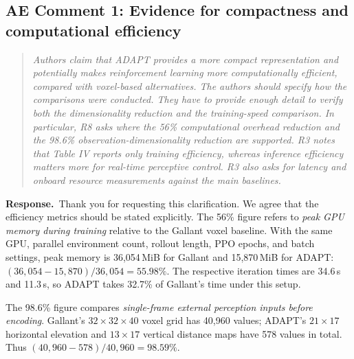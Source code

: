 \documentclass[11pt]{article}
\newenvironment{reviewcomment}{\begin{quote}\color{reviewblue}\itshape}{\end{quote}}
\newcommand{\Response}{\par\noindent\textbf{Response.}\ }
\begin{document}
\subsection*{AE Comment 1: Evidence for compactness and computational efficiency}
\begin{reviewcomment}
Authors claim that ADAPT provides a more compact representation and potentially makes reinforcement learning more computationally efficient, compared with voxel-based alternatives. The authors should specify how the comparisons were conducted. They have to provide enough detail to verify both the dimensionality reduction and the training-speed comparison. In particular, R8 asks where the 56\% computational overhead reduction and the 98.6\% observation-dimensionality reduction are supported. R3 notes that Table IV reports only training efficiency, whereas inference efficiency matters more for real-time perceptive control. R3 also asks for latency and onboard resource measurements against the main baselines.
\end{reviewcomment}
\Response Thank you for requesting this clarification. We agree that the efficiency metrics should be stated explicitly. The 56\% figure refers to \emph{peak GPU memory during training} relative to the Gallant voxel baseline. With the same GPU, parallel environment count, rollout length, PPO epochs, and batch settings, peak memory is 36,054\,MiB for Gallant and 15,870\,MiB for ADAPT: $(36{,}054-15{,}870)/36{,}054=55.98\%$. The respective iteration times are 34.6\,s and 11.3\,s, so ADAPT takes 32.7\% of Gallant's time under this setup.

The 98.6\% figure compares \emph{single-frame external perception inputs before encoding}. Gallant's $32\times32\times40$ voxel grid has 40,960 values; ADAPT's $21\times17$ horizontal elevation and $13\times17$ vertical distance maps have 578 values in total. Thus $(40{,}960-578)/40{,}960=98.59\%$.
\end{document}
